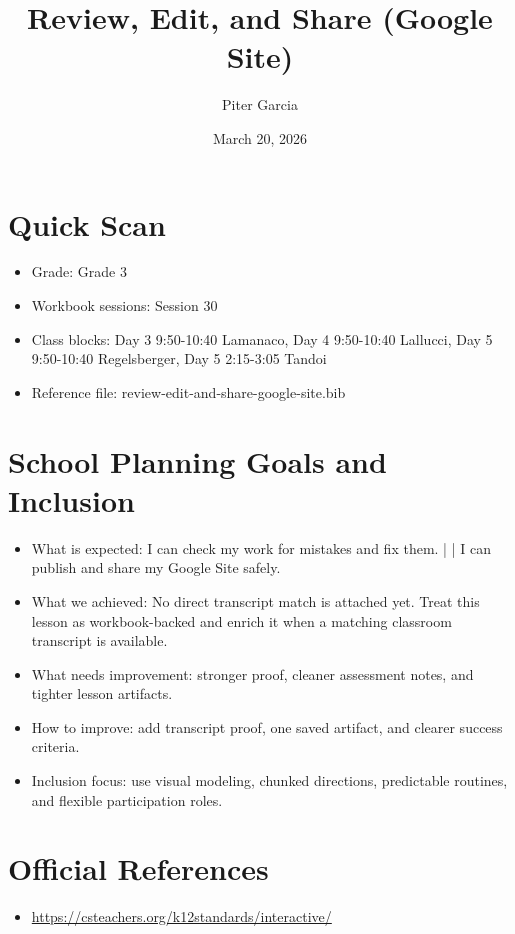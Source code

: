 \documentclass[11pt]{article}
\title{Review, Edit, and Share (Google Site)}
\author{Piter Garcia}
\date{March 20, 2026}
\begin{document}
\maketitle
\section*{Quick Scan}
\begin{itemize}[leftmargin=*]
\item Grade: Grade 3
\item Workbook sessions: Session 30
\item Class blocks: Day 3 9:50-10:40 Lamanaco, Day 4 9:50-10:40 Lallucci, Day 5 9:50-10:40 Regelsberger, Day 5 2:15-3:05 Tandoi
\item Reference file: review-edit-and-share-google-site.bib
\end{itemize}
\section*{School Planning Goals and Inclusion}
\begin{itemize}[leftmargin=*]
\item What is expected: I can check my work for mistakes and fix them. | | I can publish and share my Google Site safely.
\item What we achieved: No direct transcript match is attached yet. Treat this lesson as workbook-backed and enrich it when a matching classroom transcript is available.
\item What needs improvement: stronger proof, cleaner assessment notes, and tighter lesson artifacts.
\item How to improve: add transcript proof, one saved artifact, and clearer success criteria.
\item Inclusion focus: use visual modeling, chunked directions, predictable routines, and flexible participation roles.
\end{itemize}
\section*{Official References}
\begin{itemize}[leftmargin=*]
\item \url{https://csteachers.org/k12standards/interactive/}

\end{itemize}
\end{document}
